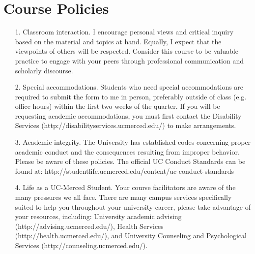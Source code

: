 \documentclass{article}
\begin{document}
\section*{Course Policies}
\begin{itemize}
 \item[1.] Classroom interaction. I encourage personal views and critical inquiry based on the material and topics at hand. Equally, I expect that the viewpoints of others will be respected. Consider this course to be valuable practice to engage with your peers through professional communication and scholarly discourse. 
 \item[2.] Special accommodations. Students who need special accommodations are required to submit the form to me in person, preferably outside of class (e.g. office hours) within the first two weeks of the quarter. If you will be requesting academic accommodations, you must first contact the Disability Services (http://disabilityservices.ucmerced.edu/) to make arrangements.
\item[3.] Academic integrity. The University has established codes concerning proper academic conduct and the consequences resulting from improper behavior. 
Please be aware of these policies. The official UC Conduct Standards can be found at: http://studentlife.ucmerced.edu/content/uc-conduct-standards
\item[4.] Life as a UC-Merced Student. Your course facilitators are aware of the many pressures we all face. There are many campus services specifically suited to help you throughout your university career, please take advantage of your resources, including: University academic advising (http://advising.ucmerced.edu/), Health Services (http://health.ucmerced.edu/), and University Counseling and Psychological Services (http://counseling.ucmerced.edu/).
\end{itemize}
\end{document}
